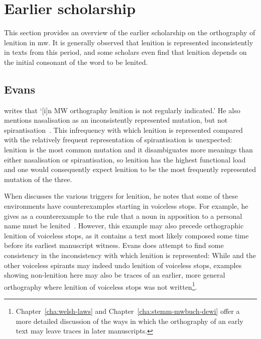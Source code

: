\section{Earlier scholarship}
\label{sec:earlier-literature}
This section provides an overview of the earlier scholarship on the orthography of lenition in \gls{mw}. It is generally observed that lenition is represented inconsistently in texts from this period, and some scholars even find that lenition depends on the initial consonant of the word to be lenited.

\subsection{Evans}
\label{sec:evans}

\Textcite[§~18]{evans_grammar_1964} writes that `[i]n MW orthography lenition is not regularly indicated.' He also mentions nasalisation as an inconsistently represented mutation, but not spirantisation~\autocite[§§~24--25]{evans_grammar_1964}. This infrequency with which lenition is represented compared with the relatively  frequent representation of  spirantisation is unexpected:  lenition is the most common mutation  and it disambiguates more meanings than either nasalisation or spirantisation, so lenition has the highest functional load and one would consequently expect lenition to be the most frequently represented mutation of the three.

When \textcite{evans_grammar_1964} discusses the various triggers for lenition, he notes that some of these environments have counterexamples starting in voiceless stops. For example, he gives   as a counterexample to the rule that a noun in apposition to a personal name must be lenited~\autocite[§~19]{evans_grammar_1964}. However, this example may also precede orthographic lenition of voiceless stops, as it contains a text most likely composed some time before its earliest manuscript witness. Evans does attempt to find some consistency in the inconsistency with which lenition is represented:
While  and the other voiceless spirants may indeed undo lenition of voiceless stops, examples showing non-lenition here may also be traces of an earlier, more general orthography where lenition of voiceless stops was not written\footnote{Chapter~\ref{cha:welsh-laws} and Chapter~\ref{cha:stemm-mwbuch-dewi} offer a more detailed discussion of the ways in which the orthography of an early text may leave traces in later manuscripts.}.

